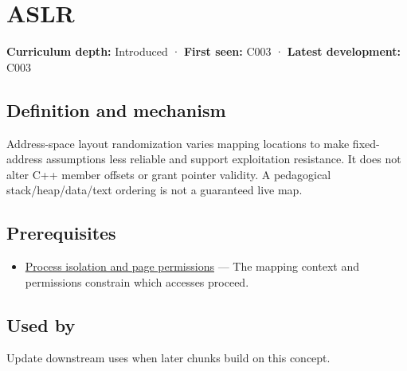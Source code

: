 \hypertarget{appendix-78cb248c8355}{}\label{referencestart:appendix-78cb248c8355}
\section{ASLR}\label{appendix-78cb248c8355-aslr}

\hypertarget{appendix-78cb248c8355-aslr}{}

\textbf{Curriculum depth:} Introduced · \textbf{First seen:} C003 · \textbf{Latest development:} C003

\begin{allmightroledefinition}

\subsection{Definition and mechanism}\label{appendix-78cb248c8355-definition-and-mechanism}

\hypertarget{appendix-78cb248c8355-definition-and-mechanism}{}

Address-space layout randomization varies mapping locations to make fixed-address assumptions less reliable and support exploitation resistance. It does not alter C++ member offsets or grant pointer validity. A pedagogical stack/heap/data/text ordering is not a guaranteed live map.

\end{allmightroledefinition}

\subsection{Prerequisites}\label{appendix-78cb248c8355-prerequisites}

\hypertarget{appendix-78cb248c8355-prerequisites}{}

\begin{itemize}
\tightlist
\item
  \hyperref[appendix-c2a9ad1e2b49]{Process isolation and page permissions} --- The mapping context and permissions constrain which accesses proceed.
\end{itemize}

\subsection{Used by}\label{appendix-78cb248c8355-used-by}

\hypertarget{appendix-78cb248c8355-used-by}{}

Update downstream uses when later chunks build on this concept.

